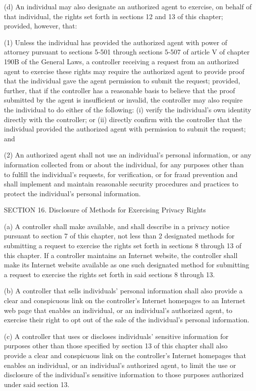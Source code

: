 (d) An individual may also designate an authorized agent to exercise, on behalf of that individual, the rights set forth in sections 12 and 13 of this chapter; provided, however, that:

(1) Unless the individual has provided the authorized agent with power of attorney pursuant to sections 5-501 through sections 5-507 of article V of chapter 190B of the General Laws, a controller receiving a request from an authorized agent to exercise these rights may require the authorized agent to provide proof that the individual gave the agent permission to submit the request; provided, further, that if the controller has a reasonable basis to believe that the proof submitted by the agent is insufficient or invalid, the controller may also require the individual to do either of the following: (i) verify the individual’s own identity directly with the controller; or (ii) directly confirm with the controller that the individual provided the authorized agent with permission to submit the request; and

(2) An authorized agent shall not use an individual’s personal information, or any information collected from or about the individual, for any purposes other than to fulfill the individual’s requests, for verification, or for fraud prevention and shall implement and maintain reasonable security procedures and practices to protect the individual’s personal information.

SECTION 16. Disclosure of Methods for Exercising Privacy Rights

(a) A controller shall make available, and shall describe in a privacy notice pursuant to section 7 of this chapter, not less than 2 designated methods for submitting a request to exercise the rights set forth in sections 8 through 13 of this chapter. If a controller maintains an Internet website, the controller shall make its Internet website available as one such designated method for submitting a request to exercise the rights set forth in said sections 8 through 13. 

(b) A controller that sells individuals’ personal information shall also provide a clear and conspicuous link on the controller’s Internet homepages to an Internet web page that enables an individual, or an individual’s authorized agent, to exercise their right to opt out of the sale of the individual’s personal information.

(c) A controller that uses or discloses individuals’ sensitive information for purposes other than those specified by section 13 of this chapter shall also provide a clear and conspicuous link on the controller’s Internet homepages that enables an individual, or an individual’s authorized agent, to limit the use or disclosure of the individual’s sensitive information to those purposes authorized under said section 13.

